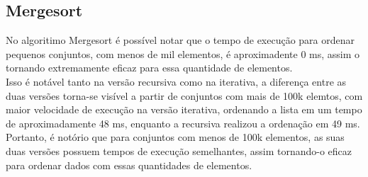 \subsection{Mergesort}

No algoritimo Mergesort é possível notar que o tempo de execução para ordenar pequenos conjuntos, com menos de mil elementos, é aproximadente 0 ms, assim o tornando extremamente eficaz para essa quantidade de elementos. \\

Isso é notável tanto na versão recursiva como na iterativa, a diferença entre as duas versões torna-se visível a partir de conjuntos com mais de 100k elemtos, com maior velocidade de execução na versão iterativa, ordenando a lista em um tempo de aproximadamente 48 ms, enquanto a recursiva realizou a ordenação em 49 ms. \\

Portanto, é notório que para conjuntos com menos de 100k elementos, as suas duas versões possuem tempos de execução semelhantes, assim tornando-o eficaz para ordenar dados com essas quantidades de elementos.